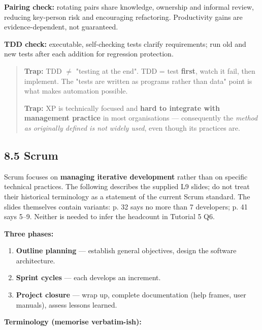 \begin{studycolumns}
\textbf{Pairing check:} rotating pairs share knowledge, ownership and informal review, reducing key-person risk and encouraging refactoring. Productivity gains are evidence-dependent, not guaranteed.

\textbf{TDD check:} executable, self-checking tests clarify requirements; run old and new tests after each addition for regression protection.


\begin{quote}\small\color{navy}
\textbf{Trap:} TDD \ensuremath{\neq} "testing at the end". TDD = test \textbf{first}, watch it fail, then implement. The "tests are written as programs rather than data" point is what makes automation possible.

\textbf{Trap:} XP is technically focused and \textbf{hard to integrate with management practice} in most organisations --- consequently the \emph{method as originally defined is not widely used}, even though its practices are.

\end{quote}
\subsection*{8.5 Scrum}
Scrum focuses on \textbf{managing iterative development} rather than on specific technical practices. The following describes the supplied L9 slides; do not treat their historical terminology as a statement of the current Scrum standard. The slides themselves contain variants: p. 32 says no more than 7 developers; p. 41 says 5--9. Neither is needed to infer the headcount in Tutorial 5 Q6.

\textbf{Three phases:}

\begin{enumerate}
\item \textbf{Outline planning} --- establish general objectives, design the software architecture.
\item \textbf{Sprint cycles} --- each develops an increment.
\item \textbf{Project closure} --- wrap up, complete documentation (help frames, user manuals), assess lessons learned.
\end{enumerate}
\textbf{Terminology (memorise verbatim-ish):}



\end{studycolumns}
